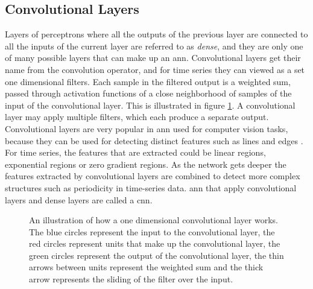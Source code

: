 \subsection{Convolutional Layers}
Layers of perceptrons where all the outputs of the previous layer are connected to all the inputs of the current layer are referred to as \textit{dense}, and they are only one of many possible layers that can make up an \acrshort{ann}. Convolutional layers get their name from the convolution operator, and for time series they can viewed as a set one dimensional filters. Each sample in the filtered output is a weighted sum, passed through activation functions of a close neighborhood of samples of the input of the convolutional layer. This is illustrated in figure \ref{fig:conv}. A convolutional layer may apply multiple filters, which each produce a separate output. Convolutional layers are very popular in \acrshort{ann} used for computer vision tasks, because they can be used for detecting distinct features such as lines and edges \cite{dl_book}. For time series, the features that are extracted could be linear regions, exponential regions or zero gradient regions. As the network gets deeper the features extracted by convolutional layers are combined to detect more complex structures such as periodicity in time-series data. \acrshort{ann} that apply convolutional layers and dense layers are called a \acrfull{cnn}.

\begin{figure}
    \centering
    
    \caption{An illustration of how a one dimensional convolutional layer works. The blue circles represent the input to the convolutional layer, the red circles represent units that make up the convolutional layer, the green circles represent the output of the convolutional layer, the thin arrows between units represent the weighted sum and the thick arrow represents the sliding of the filter over the input.}
    \label{fig:conv}
\end{figure}

